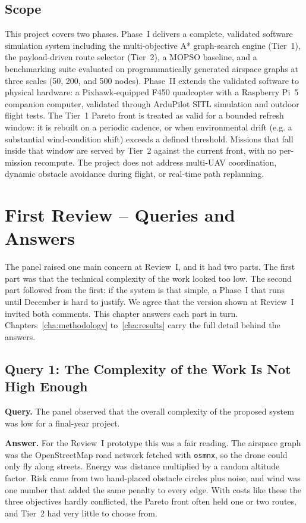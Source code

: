 \documentclass{ssnreview}
\newcommand{\flowchapter}[1]{\par\addvspace{30pt}\let\origclearpage\clearpage\let\clearpage\relax\chapter{#1}\let\clearpage\origclearpage}  %
\begin{document}
\section{Scope}

This project covers two phases. Phase~I delivers a complete, validated software
simulation system including the multi-objective A* graph-search engine (Tier~1), the
payload-driven route selector (Tier~2), a MOPSO baseline, and a benchmarking suite
evaluated on programmatically generated airspace graphs at three scales (50, 200, and
500 nodes). Phase~II extends the validated software to physical hardware: a
Pixhawk-equipped F450 quadcopter with a Raspberry Pi~5 companion computer, validated
through ArduPilot SITL simulation and outdoor flight tests. The Tier~1 Pareto front is
treated as valid for a bounded refresh window: it is rebuilt on a periodic cadence, or
when environmental drift (e.g. a substantial wind-condition shift) exceeds a defined
threshold. Missions that fall inside that window are served by Tier~2 against the current
front, with no per-mission recompute.
The project does not address multi-UAV coordination, dynamic obstacle avoidance during
flight, or real-time path replanning.


\flowchapter{First Review -- Queries and Answers}\label{cha:queries}

The panel raised one main concern at Review~I, and it had two parts. The first part was
that the technical complexity of the work looked too low. The second part followed from
the first: if the system is that simple, a Phase~I that runs until December is hard to
justify. We agree that the version shown at Review~I invited both comments. This chapter
answers each part in turn. Chapters~\ref{cha:methodology} to~\ref{cha:results} carry the
full detail behind the answers.

\section{Query 1: The Complexity of the Work Is Not High Enough}

\noindent\textbf{Query.} The panel observed that the overall complexity of the proposed
system was low for a final-year project.

\medskip
\noindent\textbf{Answer.} For the Review~I prototype this was a fair reading. The airspace
graph was the OpenStreetMap road network fetched with \texttt{osmnx}, so the drone could
only fly along streets. Energy was distance multiplied by a random altitude factor. Risk
came from two hand-placed obstacle circles plus noise, and wind was one number that added
the same penalty to every edge. With costs like these the three objectives hardly
conflicted, the Pareto front often held one or two routes, and Tier~2 had very little to
choose from.
\end{document}
